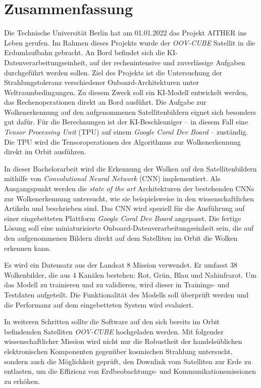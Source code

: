 {

\setlength{\parindent}{0pt}
\setlength{\parskip}{1em}

\section*{Zusammenfassung}

Die Technische Universität Berlin hat am 01.01.2022 das Projekt AITHER ins Leben gerufen. Im Rahmen dieses Projekts wurde der \textit{OOV-CUBE} Satellit in die Erdumlaufbahn gebracht. An Bord befindet sich die KI-Daten\-ver\-ar\-bei\-tungs\-ein\-heit, auf der rechenintensive und zuverlässige Aufgaben durchgeführt werden sollen. Ziel des Projekts ist die Untersuchung der Strahlungstoleranz verschiedener Onboard-Architekturen unter Welt\-raum\-be\-ding\-un\-gen. Zu diesem Zweck soll ein KI-Modell entwickelt werden, das Rechenoperationen direkt an Bord ausführt. Die Aufgabe zur Wolkenerkennung auf den aufgenommenen Satellitenbildern eignet sich besonders gut dafür. Für die Berechnungen ist der KI-Beschleuniger -- in diesem Fall eine \textit{Tensor Processing Unit} (TPU) auf einem \textit{Google Coral Dev Board} -- zuständig. Die TPU wird die Tensoroperationen des Algorithmus zur Wolkenerkennung direkt im Orbit ausführen.

In dieser Bachelorarbeit wird die Erkennung der Wolken auf den Satellitenbildern mithilfe von \textit{Convolutional Neural Network} (CNN) implementiert. Als Ausgangspunkt werden die \textit{state of the art} Architekturen der bestehenden CNNs zur Wolkenerkennung untersucht, wie sie beispielsweise in den wissenschaftlichen Artikeln \cite{CloudNet2019} und \cite{CloudDet2018} beschrieben sind. Das CNN wird speziell für die Ausführung auf einer eingebetteten Plattform \textit{Google Coral Dev Board} angepasst. Die fertige Lösung soll eine miniaturisierte Onboard-Da\-ten\-ver\-ar\-bei\-tungs\-ein\-heit sein, die auf den aufgenommenen Bildern direkt auf dem Satelliten im Orbit die Wolken erkennen kann.

Es wird ein Datensatz aus der Landsat 8 Mission verwendet. Er umfasst 38 Wolkenbilder, die aus 4 Kanälen bestehen: Rot, Grün, Blau und Nahinfrarot. Um das Modell zu trainieren und zu validieren, wird dieser in Trainings- und Testdaten aufgeteilt. Die Funktionalität des Modells soll überprüft werden und die Performanz auf dem eingebetteten System wird evaluiert. 

In weiteren Schritten sollte die Software auf den sich bereits im Orbit befindenden Satelliten \textit{OOV-CUBE} hochgeladen werden. Mit folgender wissenschaftlicher Mission wird nicht nur die Robustheit der handelsüblichen elektronischen Komponenten gegenüber kosmischen Strahlung untersucht, sondern auch die Möglichkeit geprüft, den Downlink vom Satelliten zur Erde zu entlasten, um die Effizienz von Erdbeobachtungs- und Kommunikationsmissionen zu erhöhen.

}
